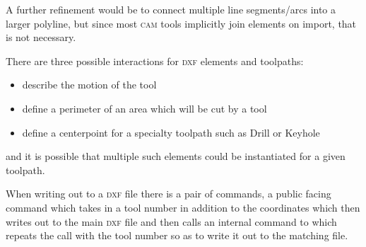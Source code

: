 \documentclass{ltxdoc}
\begin{document}
A further refinement would be to connect multiple line segments/arcs into a larger polyline, but since most \textsc{cam} tools implicitly join elements on import, that is not necessary.
 
There are three possible interactions for \textsc{dxf} elements and toolpaths:

\begin{itemize}
 \item describe the motion of the tool
 \item define a perimeter of an area which will be cut by a tool
 \item define a centerpoint for a specialty toolpath such as Drill or Keyhole
\end{itemize}
 
\noindent and it is possible that multiple such elements could be instantiated for a given toolpath.
 
When writing out to a \textsc{dxf} file there is a pair of commands, a public facing command which takes in a tool number in addition to the coordinates which then writes out to the main \textsc{dxf} file and then calls an internal command to which repeats the call with the tool number so as to write it out to the matching file.

%
%
%
\end{document}

